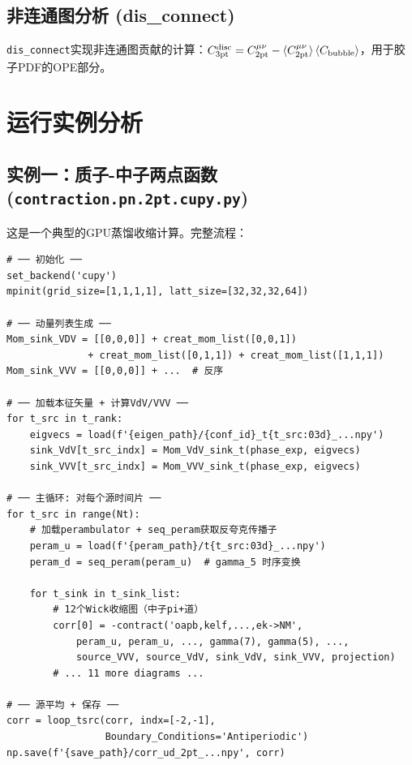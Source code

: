\documentclass[11pt,a4paper]{ctexart}
\begin{document}
\subsection{非连通图分析 (dis\_connect)}

\texttt{dis\_connect}实现非连通图贡献的计算：$C_{3\mathrm{pt}}^{\mathrm{disc}} = C_{2\mathrm{pt}}^{\mu\nu} - \braket{C_{2\mathrm{pt}}^{\mu\nu}} \braket{C_{\mathrm{bubble}}}$，用于胶子PDF的OPE部分。

\section{运行实例分析}

\subsection{实例一：质子-中子两点函数 (\texttt{contraction.pn.2pt.cupy.py})}

这是一个典型的GPU蒸馏收缩计算。完整流程：

\begin{codebox}[实例一主要流程]
\begin{lstlisting}[style=python]
# ── 初始化 ──
set_backend('cupy')
mpinit(grid_size=[1,1,1,1], latt_size=[32,32,32,64])

# ── 动量列表生成 ──
Mom_sink_VDV = [[0,0,0]] + creat_mom_list([0,0,1])
              + creat_mom_list([0,1,1]) + creat_mom_list([1,1,1])
Mom_sink_VVV = [[0,0,0]] + ...  # 反序

# ── 加载本征矢量 + 计算VdV/VVV ──
for t_src in t_rank:
    eigvecs = load(f'{eigen_path}/{conf_id}_t{t_src:03d}_...npy')
    sink_VdV[t_src_indx] = Mom_VdV_sink_t(phase_exp, eigvecs)
    sink_VVV[t_src_indx] = Mom_VVV_sink_t(phase_exp, eigvecs)

# ── 主循环: 对每个源时间片 ──
for t_src in range(Nt):
    # 加载perambulator + seq_peram获取反夸克传播子
    peram_u = load(f'{peram_path}/t{t_src:03d}_...npy')
    peram_d = seq_peram(peram_u)  # gamma_5 时序变换

    for t_sink in t_sink_list:
        # 12个Wick收缩图（中子pi+道）
        corr[0] = -contract('oapb,kelf,...,ek->NM',
            peram_u, peram_u, ..., gamma(7), gamma(5), ...,
            source_VVV, source_VdV, sink_VdV, sink_VVV, projection)
        # ... 11 more diagrams ...

# ── 源平均 + 保存 ──
corr = loop_tsrc(corr, indx=[-2,-1],
                 Boundary_Conditions='Antiperiodic')
np.save(f'{save_path}/corr_ud_2pt_...npy', corr)
\end{lstlisting}
\end{codebox}
\end{document}
